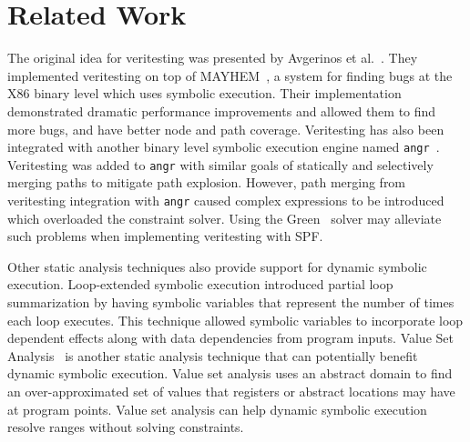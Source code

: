 \section{Related Work}
%
The original idea for veritesting was presented by Avgerinos et al.~\cite{veritesting}.
%
They implemented veritesting on top of MAYHEM~\cite{mayhem}, a system for finding bugs at the X86 binary level which uses symbolic execution.
%
Their implementation demonstrated dramatic performance improvements and allowed them to find more bugs, and have better node and path coverage.
%
Veritesting has also been integrated with another binary level symbolic execution engine named {\tt angr}~\cite{angr}.
%
Veritesting was added to {\tt angr} with similar goals of statically and selectively merging paths to mitigate path explosion.
%
However, path merging from veritesting integration with {\tt angr} caused complex expressions to be introduced which overloaded the constraint solver.
%
Using the Green~\cite{green} solver may alleviate such problems when implementing veritesting with SPF.
%
%

Other static analysis techniques also provide support for dynamic symbolic execution.
%
Loop-extended symbolic execution introduced partial loop summarization by having symbolic variables that represent the number of times each loop executes.
%
This technique allowed symbolic variables to incorporate loop dependent effects along with data dependencies from program inputs.
%
Value Set Analysis~\cite{vsa} is another static analysis technique that can potentially benefit dynamic symbolic execution.
%
Value set analysis uses an abstract domain to find an over-approximated set of values that registers or abstract locations may have at program points.
%
Value set analysis can help dynamic symbolic execution resolve ranges without solving constraints.

